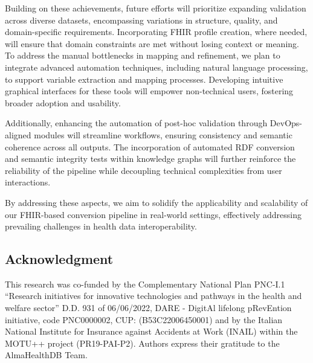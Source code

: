 Building on these achievements, future efforts will prioritize expanding validation across diverse datasets, encompassing variations in structure, quality, and domain-specific requirements. Incorporating FHIR profile creation, where needed, will ensure that domain constraints are met without losing context or meaning. To address the manual bottlenecks in mapping and refinement, we plan to integrate advanced automation techniques, including natural language processing, to support variable extraction and mapping processes. Developing intuitive graphical interfaces for these tools will empower non-technical users, fostering broader adoption and usability.

Additionally, enhancing the automation of post-hoc validation through DevOps-aligned modules will streamline workflows, ensuring consistency and semantic coherence across all outputs. The incorporation of automated RDF conversion and semantic integrity tests within knowledge graphs will further reinforce the reliability of the pipeline while decoupling technical complexities from user interactions.

By addressing these aspects, we aim to solidify the applicability and scalability of our FHIR-based conversion pipeline in real-world settings, effectively addressing prevailing challenges in health data interoperability.

\subsection*{Acknowledgment}
This research was co-funded by the Complementary National Plan PNC-I.1 “Research initiatives for innovative technologies and pathways in the health and welfare sector” D.D. 931 of 06/06/2022, DARE - DigitAl lifelong pRevEntion initiative, code PNC0000002, CUP: 
(B53C22006450001) and by the Italian National Institute for Insurance against Accidents at Work (INAIL) within the MOTU++ project (PR19-PAI-P2). Authors express their gratitude to the AlmaHealthDB Team.

